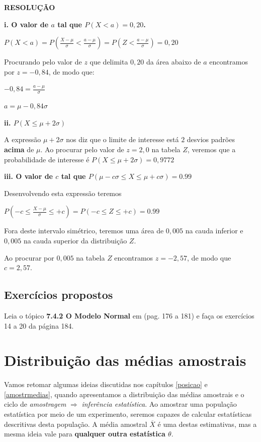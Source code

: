 \documentclass[
]{book}
\begin{document}
\textbf{RESOLUÇÃO}

\textbf{i. O valor de \(a\) tal que \(P(X < a) = 0,20\).}

\(P(X < a) = P(\frac{X - \mu}{\sigma} < \frac{a - \mu}{\sigma}) = P(Z < \frac{a - \mu}{\sigma}) = 0,20\)

Procurando pelo valor de \(z\) que delimita \(0,20\) da área abaixo de \(a\) encontramos por \(z = -0,84\), de modo que:

\(-0,84 = \frac{a - \mu}{\sigma}\)

\(a = \mu -0,84\sigma\)

\textbf{ii. \(P(X \le \mu + 2\sigma)\)}

A expressão \(\mu + 2\sigma\) nos diz que o limite de interesse está \(2\) desvios padrões \textbf{acima} de \(\mu\). Ao procurar pelo valor de \(z = 2,0\) na tabela \(Z\), veremos que a probabilidade de interesse é \(P(X \le \mu + 2\sigma) = 0,9772\)

\textbf{iii. O valor de \(c\) tal que \(P(\mu -c\sigma \le X \le \mu +c\sigma) = 0.99\)}

Desenvolvendo esta expressão teremos

\(P(-c \le \frac{X - \mu}{\sigma} \le +c) = P(-c \le Z \le +c) = 0.99\)

Fora deste intervalo simétrico, teremos uma área de \(0,005\) na cauda inferior e \(0,005\) na cauda superior da distribuição \(Z\).

Ao procurar por \(0,005\) na tabela \(Z\) encontramos \(z = -2,57\), de modo que \(c = 2,57\).

\hypertarget{exercuxedcios-propostos}{%
\section{Exercícios propostos}\label{exercuxedcios-propostos}}

Leia o tópico \textbf{7.4.2 O Modelo Normal} em \citep{bussabemoretin6a} (pag. 176 a 181) e faça os exercícios 14 a 20 da página 184.

\hypertarget{tcl}{%
\chapter{Distribuição das médias amostrais}\label{tcl}}

Vamos retomar algumas ideias discutidas nos capítulos \ref{posicao} e \ref{amostrmedias}, quando apresentamos a distribuição das médias amostrais e o ciclo de \emph{amostragem} \(\Rightarrow\) \emph{inferência estatística}. Ao amostrar uma população estatística por meio de um experimento, seremos capazes de calcular estatísticas descritivas desta população. A média amostral \(\overline{X}\) é uma destas estimativas, mas a mesma ideia vale para \textbf{qualquer outra estatística \(\theta\)}.
\end{document}
